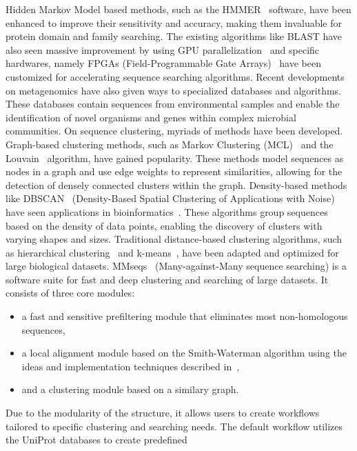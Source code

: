 \documentclass[twoside,a4paper,bsc]{master}
\begin{document}
Hidden
Markov Model based
methods, such as the HMMER~\cite{finn2011hmmer} software, have been
enhanced to improve their
sensitivity and accuracy, making them invaluable for protein domain and
family searching. The existing algorithms like BLAST have also seen massive
improvement by using GPU parallelization~\cite{vouzis2011gpu} and specific
hardwares, namely
FPGAs (Field-Programmable Gate Arrays)~\cite{guo2012systolic} have been
customized for
accelerating sequence searching algorithms.
Recent developments on metagenomics have also given ways to specialized
databases and algorithms. These databases contain sequences from
environmental samples and enable the identification of novel organisms and
genes within complex microbial communities.
On sequence clustering, myriads of methods have been developed. Graph-based
clustering methods, such as Markov Clustering
(MCL)~\cite{shih2012identifying} and the
Louvain~\cite{rahiminejad2019topological} algorithm,
have gained popularity. These methods model sequences as nodes in a graph
and use edge weights to represent similarities, allowing for the detection
of densely connected clusters within the graph. Density-based methods like
DBSCAN~\cite{ester1996density} (Density-Based Spatial Clustering of
Applications with Noise) have
seen applications in bioinformatics~\cite{karim2021deep}. These algorithms
group sequences based on
the density of data points, enabling the discovery of clusters with varying
shapes and sizes. Traditional distance-based clustering algorithms, such as
hierarchical clustering~\cite{lafond2017new} and
k-means~\cite{hussain2011fpga}, have been adapted and optimized for
large biological datasets.
MMseqs~\cite{hauser2014mmseqs} (Many-against-Many sequence searching) is a
software suite for fast
and deep clustering and searching of large datasets.
It consists of three core modules:
\begin{itemize}
\item a fast and sensitive preﬁltering module
that eliminates most non-homologous sequences,
\item a local alignment module based on the Smith-Waterman algorithm
using the ideas and implementation techniques described
in~\cite{Farrar:2007hs,ZHA:LEE:GAR:MAR:2013},
\item and a clustering module based on a
similary graph.
\end{itemize}
Due to the modularity of the structure, it allows users to
create workflows tailored to specific clustering and searching needs. The
default workflow utilizes the UniProt databases to create predefined
\end{document}

